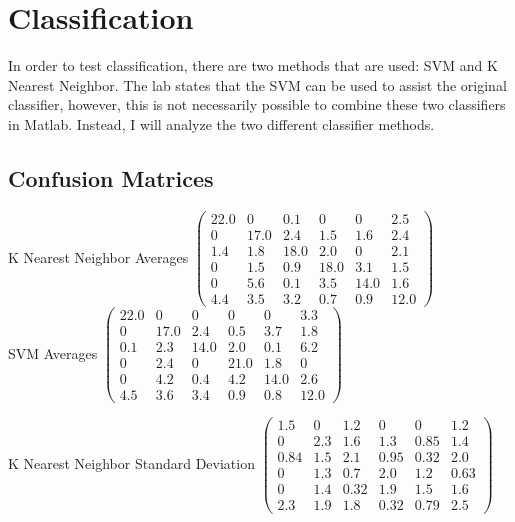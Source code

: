\documentclass[11pt, a4paper]{article}
\begin{document}
\section{Classification}

In order to test classification, there are two methods that are used: SVM and K Nearest Neighbor. The lab states that the SVM can be used to assist the original classifier, however, this is not necessarily possible to combine these two classifiers in Matlab. Instead, I will analyze the two different classifier methods. \\



	


\subsection{Confusion Matrices}

K Nearest Neighbor Averages \hfill $\left(\begin{array}{cccccc} 22.0 & 0 & 0.1 & 0 & 0 & 2.5\\ 0 & 17.0 & 2.4 & 1.5 & 1.6 & 2.4\\ 1.4 & 1.8 & 18.0 & 2.0 & 0 & 2.1\\ 0 & 1.5 & 0.9 & 18.0 & 3.1 & 1.5\\ 0 & 5.6 & 0.1 & 3.5 & 14.0 & 1.6\\ 4.4 & 3.5 & 3.2 & 0.7 & 0.9 & 12.0 \end{array}\right)
$ \\

SVM Averages \hfill
$\left(\begin{array}{cccccc} 22.0 & 0 & 0 & 0 & 0 & 3.3\\ 0 & 17.0 & 2.4 & 0.5 & 3.7 & 1.8\\ 0.1 & 2.3 & 14.0 & 2.0 & 0.1 & 6.2\\ 0 & 2.4 & 0 & 21.0 & 1.8 & 0\\ 0 & 4.2 & 0.4 & 4.2 & 14.0 & 2.6\\ 4.5 & 3.6 & 3.4 & 0.9 & 0.8 & 12.0 \end{array}\right)$

K Nearest Neighbor Standard Deviation \hfill $\left(\begin{array}{cccccc} 1.5 & 0 & 1.2 & 0 & 0 & 1.2\\ 0 & 2.3 & 1.6 & 1.3 & 0.85 & 1.4\\ 0.84 & 1.5 & 2.1 & 0.95 & 0.32 & 2.0\\ 0 & 1.3 & 0.7 & 2.0 & 1.2 & 0.63\\ 0 & 1.4 & 0.32 & 1.9 & 1.5 & 1.6\\ 2.3 & 1.9 & 1.8 & 0.32 & 0.79 & 2.5 \end{array}\right)
$
\end{document}
